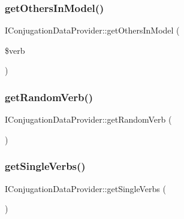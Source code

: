 \hypertarget{interface_i_conjugation_data_provider_a5c7f6041f670ef5560f72577f5f25867}{}\label{interface_i_conjugation_data_provider_a5c7f6041f670ef5560f72577f5f25867} 
\subsubsection{\texorpdfstring{get\+Others\+In\+Model()}{getOthersInModel()}}
{\footnotesize\ttfamily I\+Conjugation\+Data\+Provider\+::get\+Others\+In\+Model (\begin{DoxyParamCaption}\item[{}]{\$verb }\end{DoxyParamCaption})}

\hypertarget{interface_i_conjugation_data_provider_a254299b72e84b00aec82d4037d484666}{}\label{interface_i_conjugation_data_provider_a254299b72e84b00aec82d4037d484666} 
\subsubsection{\texorpdfstring{get\+Random\+Verb()}{getRandomVerb()}}
{\footnotesize\ttfamily I\+Conjugation\+Data\+Provider\+::get\+Random\+Verb (\begin{DoxyParamCaption}{ }\end{DoxyParamCaption})}

\hypertarget{interface_i_conjugation_data_provider_ac409d7c67841ef17b3aecaf330b9e675}{}\label{interface_i_conjugation_data_provider_ac409d7c67841ef17b3aecaf330b9e675} 
\subsubsection{\texorpdfstring{get\+Single\+Verbs()}{getSingleVerbs()}}
{\footnotesize\ttfamily I\+Conjugation\+Data\+Provider\+::get\+Single\+Verbs (\begin{DoxyParamCaption}{ }\end{DoxyParamCaption})}

